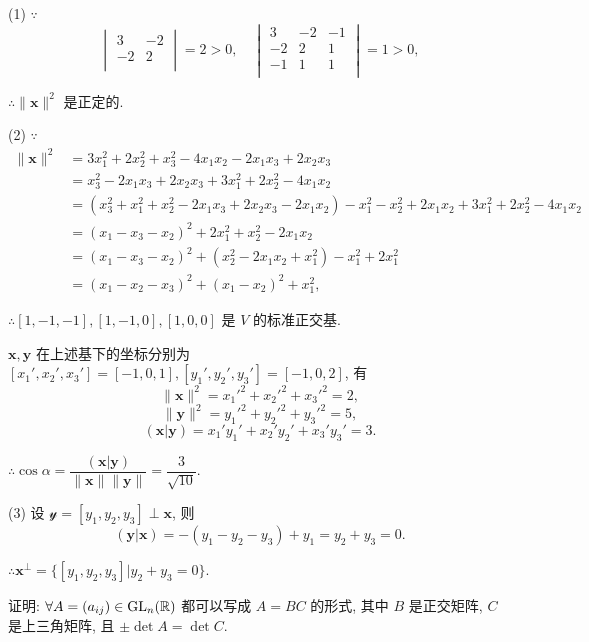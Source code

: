 \documentclass{ctexart}
\begin{document}
\begin{solution}
    (1) $\because$
    \[\begin{vmatrix}
        3 & -2 \\
        -2 & 2 \\
    \end{vmatrix}=2>0,\quad\begin{vmatrix}
        3 & -2 & -1 \\
        -2 & 2 & 1 \\
        -1 & 1 & 1 \\
    \end{vmatrix}=1>0,\]

    $\therefore\|\boldsymbol{x}\|^2$ 是正定的.

    (2) $\because$
    \begin{align*}
        \|\boldsymbol{x}\|^2 & =3x_1^2+2x_2^2+x_3^2-4x_1x_2-2x_1x_3+2x_2x_3 \\
        & =x_3^2-2x_1x_3+2x_2x_3+3x_1^2+2x_2^2-4x_1x_2 \\
        & =(x_3^2+x_1^2+x_2^2-2x_1x_3+2x_2x_3-2x_1x_2)-x_1^2-x_2^2+2x_1x_2+3x_1^2+2x_2^2-4x_1x_2 \\
        & =(x_1-x_3-x_2)^2+2x_1^2+x_2^2-2x_1x_2 \\
        & =(x_1-x_3-x_2)^2+(x_2^2-2x_1x_2+x_1^2)-x_1^2+2x_1^2 \\
        & =(x_1-x_2-x_3)^2+(x_1-x_2)^2+x_1^2,
    \end{align*}

    $\therefore[1,-1,-1],[1,-1,0],[1,0,0]$ 是 $V$ 的标准正交基.
    
    $\boldsymbol{x},\boldsymbol{y}$ 在上述基下的坐标分别为 $[x_1',x_2',x_3']=[-1,0,1],[y_1',y_2',y_3']=[-1,0,2]$, 有
    \[\|\boldsymbol{x}\|^2=x_1'^2+x_2'^2+x_3'^2=2,\]
    \[\|\boldsymbol{y}\|^2=y_1'^2+y_2'^2+y_3'^2=5,\]
    \[(\boldsymbol{x}|\boldsymbol{y})=x_1'y_1'+x_2'y_2'+x_3'y_3'=3.\]

    $\therefore\cos\alpha=\dfrac{(\boldsymbol{x}|\boldsymbol{y})}{\|\boldsymbol{x}\|\|\boldsymbol{y}\|}=\dfrac{3}{\sqrt{10}}$.

    (3) 设 $\mathcal{y}=[y_1,y_2,y_3]\perp\boldsymbol{x}$, 则
    \[(\boldsymbol{y}|\boldsymbol{x})=-(y_1-y_2-y_3)+y_1=y_2+y_3=0.\]

    $\therefore\boldsymbol{x}^\perp=\{[y_1,y_2,y_3]|y_2+y_3=0\}$.
\end{solution}
\begin{exercise}\label{ex1.3}
    证明: $\forall A=(a_{ij})\in\operatorname{GL} _n(\mathbb{R})$ 都可以写成 $A=BC$ 的形式, 其中 $B$ 是正交矩阵, $C$ 是上三角矩阵, 且 $\pm\det A=\det C$.
\end{exercise}
\end{document}
